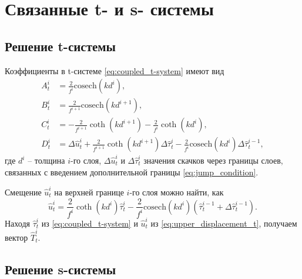 \chapter{Связанные t- и s- системы}
\label{app:coupled_systems}

\section*{Решение t-системы}

Коэффициенты в t-системе \eqref{eq:coupled_t-system} имеют вид
\begin{equation}
    \label{eq:coefficients_t-system}
    \begin{split}
        A^{i}_t &= \frac{2}{f^{i}}\text{cosech}(kd^{i}),\\
        B^{i}_t &= \frac{2}{f^{i+1}}\text{cosech}(kd^{i+1}),\\
        C^{i}_t &= -\frac{2}{f^{i+1}}\coth(kd^{i+1}) - \frac{2}{f^{i}}\coth(kd^{i}),\\
        D^{i}_t &= \Delta \hat{u}^{i}_{t} + \frac{2}{f^{i+1}}\coth(kd^{i+1})\Delta\hat{\tau}_{t}^{i} 
        - \frac{2}{f^{i}}\text{cosech}(kd^{i})\Delta\hat{\tau}_{t}^{i-1},
    \end{split}
\end{equation}
где $d^i$ -- толщина $i$-го слоя, $\Delta \hat{u}^{i}_{t}$ и $\Delta\hat{\tau}_{t}^{i}$ значения скачков через границы слоев, связанных с введением дополнительной границы \eqref{eq:jump_condition}.

Смещение $\hat{u}^{i}_{t}$ на верхней границе $i$-го слоя можно найти, как
\begin{equation}
    \label{eq:upper_displacement_t}
    \hat{u}^{i}_{t} = \frac{2}{f^{i}}\coth(kd^{i})\hat{\tau}^{i}_{t} - \frac{2}{f^{i}}\text{cosech}(kd^{i}) (\hat{\tau}^{i-1}_{t} + \Delta\hat{\tau}^{i-1}_{t}).
\end{equation}
Находя $\hat\tau_t^i$ из \eqref{eq:coupled_t-system} и $\hat{u}^i_t$ из \eqref{eq:upper_displacement_t}, получаем вектор $\hat T_t^i$.


\section*{Решение s-системы}

